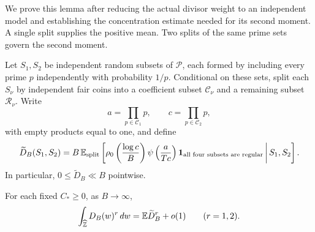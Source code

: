 We prove this lemma after reducing the actual divisor weight to an
independent model and establishing the concentration estimate needed for
its second moment. A single split supplies the positive mean. Two splits
of the same prime sets govern the second moment.

Let $S_1,S_2$ be independent random subsets of $\mathcal P$, each
formed by including every prime $p$ independently with probability
$1/p$. Conditional on these sets, split each $S_\nu$ by independent fair
coins into a coefficient subset $\mathcal C_\nu$ and a remaining subset
$\mathcal R_\nu$. Write
\[
 a=\prod_{p\in\mathcal C_1}p,\qquad
 c=\prod_{p\in\mathcal C_2}p,
\]
with empty products equal to one, and define
\begin{equation}\label{eq:13}
 \widetilde D_B(S_1,S_2)
 =B\,\mathbb E_{\mathrm{split}}\left[
  \rho_0\left(\frac{\log c}{B}\right)
  \psi\left(\frac{a}{Tc}\right)
  \mathbf 1_{\text{all four subsets are regular}}
  \,\middle|\,S_1,S_2\right].
\end{equation}
In particular, $0\le\widetilde D_B\ll B$ pointwise.

\begin{lemma}
\label{lem:amp-site-model}
For each fixed $C_*\ge0$, as $B\to\infty$,
\[
 \int_{\widehat{\mathbb Z}}D_B(w)^r\,dw=\mathbb E\widetilde D_B^r+o(1)
 \qquad(r=1,2).
\]
\end{lemma}

